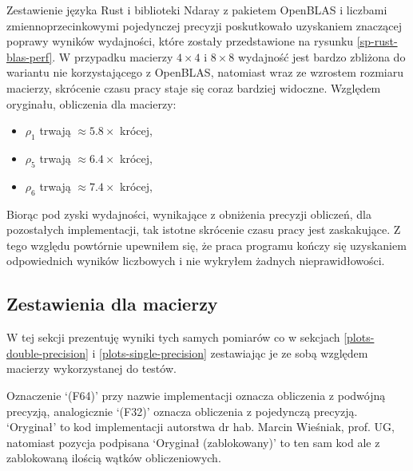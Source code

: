 \documentclass[11pt, a4paper]{article}
\begin{document}
\begin{sloppypar}
    Zestawienie języka Rust i biblioteki Ndaray z pakietem OpenBLAS i liczbami
    zmiennoprzecinkowymi pojedynczej precyzji poskutkowało uzyskaniem znaczącej poprawy
    wyników wydajności, które zostały przedstawione na rysunku \ref{sp-rust-blas-perf}.
    W przypadku macierzy $4\times4$ i $8\times8$ wydajność jest bardzo zbliżona do
    wariantu nie korzystającego z OpenBLAS, natomiast wraz ze wzrostem rozmiaru macierzy,
    skrócenie czasu pracy staje się coraz bardziej widoczne. Względem oryginału,
    obliczenia dla macierzy:
    \begin{itemize}
      \item $\rho_{1}$ trwają $\approx 5.8\times$ krócej,

      \item $\rho_{5}$ trwają $\approx 6.4\times$ krócej,

      \item $\rho_{6}$ trwają $\approx 7.4\times$ krócej,
    \end{itemize}
    Biorąc pod zyski wydajności, wynikające z obniżenia precyzji obliczeń, dla pozostałych
    implementacji, tak istotne skrócenie czasu pracy jest zaskakujące. Z tego względu powtórnie
    upewniłem się, że praca programu kończy się uzyskaniem odpowiednich wyników
    liczbowych i nie wykryłem żadnych nieprawidłowości.

    \FloatBarrier

    \subsection{Zestawienia dla macierzy}
    W tej sekcji prezentuję wyniki tych samych pomiarów co w sekcjach \ref{plots-double-precision}
    i \ref{plots-single-precision} zestawiając je ze sobą względem macierzy wykorzystanej
    do testów.

    Oznaczenie `(F64)' przy nazwie implementacji oznacza obliczenia z podwójną precyzją,
    analogicznie `(F32)' oznacza obliczenia z pojedynczą precyzją. `Oryginał' to kod implementacji
    autorstwa dr hab. Marcin Wieśniak, prof. UG, natomiast pozycja podpisana `Oryginał (zablokowany)'
    to ten sam kod ale z zablokowaną ilością wątków obliczeniowych.


\end{sloppypar}
\end{document}
